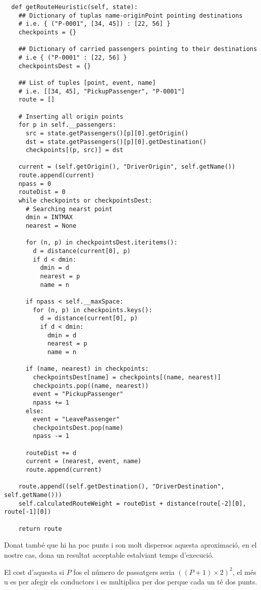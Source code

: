 \begin{verbatim}
  def getRouteHeuristic(self, state):
    ## Dictionary of tuplas name-originPoint pointing destinations
    # i.e. { ("P-0001", [34, 45]) : [22, 56] }
    checkpoints = {}
    
    ## Dictionary of carried passengers pointing to their destinations
    # i.e { ("P-0001" : [22, 56] }
    checkpointsDest = {}

    ## List of tuples [point, event, name]
    # i.e. [[34, 45], "PickupPassenger", "P-0001"]
    route = []

    # Inserting all origin points
    for p in self.__passengers:
      src = state.getPassengers()[p][0].getOrigin()
      dst = state.getPassengers()[p][0].getDestination()
      checkpoints[(p, src)] = dst

    current = (self.getOrigin(), "DriverOrigin", self.getName())
    route.append(current)
    npass = 0
    routeDist = 0
    while checkpoints or checkpointsDest:
      # Searching nearst point
      dmin = INTMAX
      nearest = None

      for (n, p) in checkpointsDest.iteritems():
        d = distance(current[0], p)
        if d < dmin:
          dmin = d
          nearest = p
          name = n

      if npass < self.__maxSpace:
        for (n, p) in checkpoints.keys():
          d = distance(current[0], p)
          if d < dmin:
            dmin = d
            nearest = p
            name = n

      if (name, nearest) in checkpoints:
        checkpointsDest[name] = checkpoints[(name, nearest)]
        checkpoints.pop((name, nearest))
        event = "PickupPassenger"
        npass += 1
      else:
        event = "LeavePassenger"
        checkpointsDest.pop(name)
        npass -= 1
        
      routeDist += d
      current = (nearest, event, name)
      route.append(current)
    
    route.append((self.getDestination(), "DriverDestination", self.getName()))
    self.calculatedRouteWeight = routeDist + distance(route[-2][0], route[-1][0])

    return route
\end{verbatim}

Donat també que hi ha poc punts i son molt dispersos aquesta aproximació, en el nostre cas,
dona un resultat acceptable estalviant temps d'execució.

El cost d'aquesta si $P$ fos el número de passatgers seria $((P+1) \times 2)^2$, el més u
es per afegir els conductors i es multiplica per dos perque cada un té dos punts.

